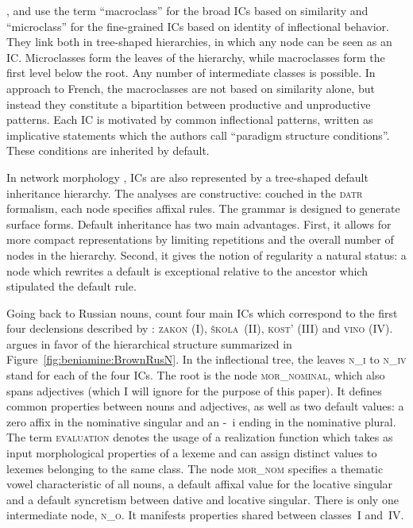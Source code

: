 \documentclass[output=paper]{langscibook}
\begin{document}
    \citet{DresslerThornton1996}, \citet{Kilani-SchochDressler2005} and \citet{DresslerKilani-SchochGagarinaPestalPoechtrager2008} use the term ``macroclass'' for the broad ICs based on similarity and ``microclass'' for the fine-grained ICs based on identity of inflectional behavior. They link both in tree-shaped hierarchies, in which any node can be seen as an IC. Microclasses form the leaves of the hierarchy, while macroclasses form the first level below the root. Any number of intermediate classes is possible. In  approach to French, the macroclasses are not based on similarity alone, but instead they constitute a bipartition between productive and unproductive patterns. Each IC is motivated by common inflectional patterns, written as implicative statements which the authors call ``paradigm structure conditions''. These conditions are inherited by default.

    In network morphology \citep{CorbettFraser1993,BrownHippisley2012}, ICs are also represented by a tree-shaped default inheritance hierarchy. The analyses are constructive: couched in the \textsc{datr} formalism, each node specifies affixal rules. The grammar is designed to generate surface forms. Default inheritance has two main advantages. First, it allows for more compact representations by limiting repetitions and the overall number of nodes in the hierarchy. Second, it gives the notion of regularity a natural status: a node which rewrites a default is exceptional relative to the ancestor which stipulated the default rule.

    \begin{sloppypar}
    Going back to Russian nouns, \citet{Brown1998} count four main ICs which correspond to the first four declensions described by \citet{Corbett1982}:
    \textsc{zakon} (I), \textsc{škola}~(II), \textsc{kost'} (III) and  \textsc{vino} (IV). \citet{Brown1998} argues in favor of the hierarchical structure summarized in Figure~\ref{fig:beniamine:BrownRusN}. In the inflectional tree, the leaves \textsc{n\_i} to \mbox{\textsc{n\_iv}} stand for each of the four ICs. The root is the node \textsc{mor\_nominal}, which also spans adjectives (which I will ignore for the purpose of this paper). It defines common properties between nouns and adjectives, as well as two default values: a zero affix in the nominative singular and an \unit{-i} ending in the nominative plural. The term \textsc{evaluation} denotes the usage of a realization function which takes as input morphological properties of a lexeme and can assign distinct values to lexemes belonging to the same class. The node \textsc{mor\_nom} specifies a thematic vowel characteristic of all nouns, a default affixal value for the locative singular and a default syncretism between dative and locative singular. There is only one intermediate node, \textsc{n\_o}. It manifests properties shared between classes~I and~IV.
    \end{sloppypar}
\end{document}

